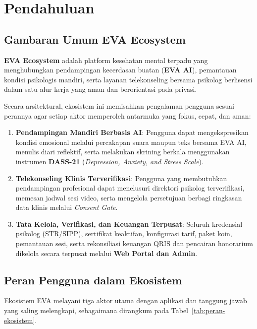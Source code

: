 \chapter{Pendahuluan}
\label{chap:pendahuluan}

\section{Gambaran Umum EVA Ecosystem}
\textbf{EVA Ecosystem} adalah platform kesehatan mental terpadu yang menghubungkan pendampingan kecerdasan buatan (\textbf{EVA AI}), pemantauan kondisi psikologis mandiri, serta layanan telekonseling bersama psikolog berlisensi dalam satu alur kerja yang aman dan berorientasi pada privasi.

Secara arsitektural, ekosistem ini memisahkan pengalaman pengguna sesuai perannya agar setiap aktor memperoleh antarmuka yang fokus, cepat, dan aman:
\begin{enumerate}[leftmargin=1.4em]
  \item \textbf{Pendampingan Mandiri Berbasis AI}: Pengguna dapat mengekspresikan kondisi emosional melalui percakapan suara maupun teks bersama EVA AI, menulis diari reflektif, serta melakukan skrining berkala menggunakan instrumen \textbf{DASS-21} (\textit{Depression, Anxiety, and Stress Scale}).
  \item \textbf{Telekonseling Klinis Terverifikasi}: Pengguna yang membutuhkan pendampingan profesional dapat menelusuri direktori psikolog terverifikasi, memesan jadwal sesi video, serta mengelola persetujuan berbagi ringkasan data klinis melalui \textit{Consent Gate}.
  \item \textbf{Tata Kelola, Verifikasi, dan Keuangan Terpusat}: Seluruh kredensial psikolog (STR/SIPP), sertifikat keaktifan, konfigurasi tarif, paket koin, pemantauan sesi, serta rekonsiliasi keuangan QRIS dan pencairan honorarium dikelola secara terpusat melalui \textbf{Web Portal dan Admin}.
\end{enumerate}


\section{Peran Pengguna dalam Ekosistem}
Ekosistem EVA melayani tiga aktor utama dengan aplikasi dan tanggung jawab yang saling melengkapi, sebagaimana dirangkum pada Tabel~\ref{tab:peran-ekosistem}.

